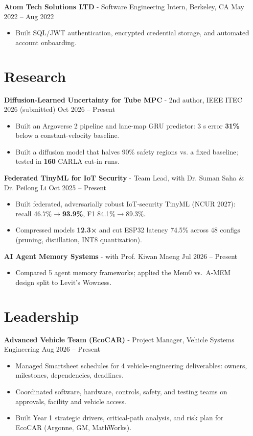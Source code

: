\documentclass[11pt,a4paper]{article}
\newcommand{\blockspace}{\vspace{0.12em}}
\newenvironment{details}{\begin{itemize}[leftmargin=1.4em, label=\textbullet, topsep=0pt, itemsep=0pt, parsep=0pt, partopsep=0pt]}{\end{itemize}}
\begin{document}
\noindent\textbf{Atom Tech Solutions LTD} - Software Engineering Intern, Berkeley, CA \hfill May 2022 -- Aug 2022
\begin{details}
\item Built SQL/JWT authentication, encrypted credential storage, and automated account onboarding.
\end{details}

\section{Research}
\noindent\textbf{Diffusion-Learned Uncertainty for Tube MPC} - 2nd author, IEEE ITEC 2026 (submitted) \hfill Oct 2026 -- Present
\begin{details}
\item Built an Argoverse 2 pipeline and lane-map GRU predictor: 3 s error \textbf{31\%} below a constant-velocity baseline.
\item Built a diffusion model that halves 90\% safety regions vs. a fixed baseline; tested in \textbf{160} CARLA cut-in runs.
\end{details}
\blockspace

\noindent\textbf{Federated TinyML for IoT Security} - Team Lead, with Dr. Suman Saha \& Dr. Peilong Li \hfill Oct 2025 -- Present
\begin{details}
\item Built federated, adversarially robust IoT-security TinyML (NCUR 2027): recall 46.7\%$\to$\textbf{93.9\%}, F1 84.1\%$\to$89.3\%.
\item Compressed models \textbf{12.3×} and cut ESP32 latency 74.5\% across 48 configs (pruning, distillation, INT8 quantization).
\end{details}
\blockspace

\noindent\textbf{AI Agent Memory Systems} - with Prof. Kiwan Maeng \hfill Jul 2026 -- Present
\begin{details}
\item Compared 5 agent memory frameworks; applied the Mem0 vs.\ A-MEM design split to Levit's Wowness.
\end{details}

\section{Leadership}
\noindent\textbf{Advanced Vehicle Team (EcoCAR)} - Project Manager, Vehicle Systems Engineering \hfill Aug 2026 -- Present
\begin{details}
\item Managed Smartsheet schedules for 4 vehicle-engineering deliverables: owners, milestones, dependencies, deadlines.
\item Coordinated software, hardware, controls, safety, and testing teams on approvals, facility and vehicle access.
\item Built Year 1 strategic drivers, critical-path analysis, and risk plan for EcoCAR (Argonne, GM, MathWorks).
\end{details}
\blockspace
\end{document}
